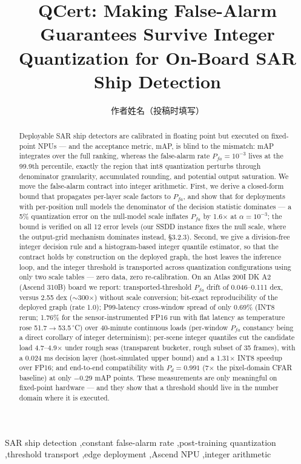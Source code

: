\documentclass[preprint,12pt]{elsarticle}
\begin{document}
\begin{frontmatter}

\title{QCert: Making False-Alarm Guarantees Survive Integer Quantization
       for On-Board SAR Ship Detection}

\author[inst1]{作者姓名（投稿时填写）}

\begin{abstract}
Deployable SAR ship detectors are calibrated in floating point but executed on
fixed-point NPUs --- and the acceptance metric, mAP, is blind to the mismatch:
mAP integrates over the full ranking, whereas the false-alarm rate
$P_{fa}=10^{-3}$ lives at the 99.9th percentile, exactly the region that int8
quantization perturbs through denominator granularity, accumulated rounding,
and potential output saturation. We move the false-alarm contract into integer
arithmetic. First, we derive a closed-form bound that propagates per-layer
scale factors to $P_{fa}$, and show that for deployments with per-position null
models the denominator of the decision statistic dominates --- a 5\%
quantization error on the null-model scale inflates $P_{fa}$ by 1.6$\times$ at
$\alpha=10^{-3}$; the bound is verified on all 12 error levels (our SSDD
instance fixes the null scale, where the output-grid mechanism dominates
instead, \S3.2.3). Second, we give a division-free integer decision rule and a
histogram-based integer quantile estimator, so that the contract holds by
construction on the deployed graph, the host leaves the inference loop, and the
integer threshold is transported across quantization configurations using only
two scale tables --- zero data, zero re-calibration. On an Atlas 200I DK A2
(Ascend 310B) board we report: transported-threshold $P_{fa}$ drift of
0.046--0.111 dex, versus 2.55 dex ($\sim$300$\times$) without scale
conversion; bit-exact reproducibility of the deployed graph (rate 1.0);
P99-latency cross-window spread of only 0.69\% (INT8 rerun; 1.76\% for the
sensor-instrumented FP16 run with flat latency as temperature rose
51.7$\to$53.5\,$^\circ$C) over 40-minute continuous loads (per-window
$P_{fa}$ constancy being a direct corollary of integer determinism); per-scene
integer quantiles cut the candidate load 4.7--4.9$\times$ under rough seas
(transparent bucketer, rough subset of 35 frames), with a 0.024 ms decision
layer (host-simulated upper bound) and a 1.31$\times$ INT8 speedup over FP16;
and end-to-end compatibility with $P_d=0.991$ (7$\times$ the pixel-domain CFAR
baseline) at only $-0.29$ mAP points. These measurements are only meaningful
on fixed-point hardware --- and they show that a threshold should live in the
number domain where it is executed.
\end{abstract}

\begin{keyword}
SAR ship detection \sep constant false-alarm rate \sep post-training
quantization \sep threshold transport \sep edge deployment \sep Ascend NPU
\sep integer arithmetic
\end{keyword}

\end{frontmatter}
\end{document}
